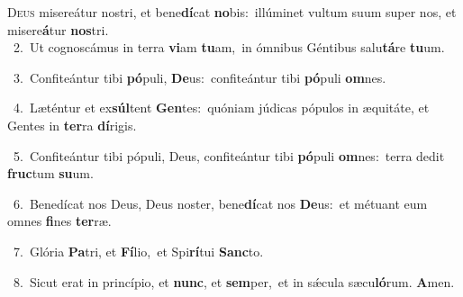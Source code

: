 \lettrine{\initial\textcolor{\initialcolor}{D}}{eus} misereátur nostri, et bene\-\textbf{dí}\-cat \textbf{no}\-bis:~\star illúminet vultum suum super nos, et misere\-\textbf{á}\-tur \textbf{nos}\-tri.\\
{\numbfont\textcolor{\numbcolor}{~2.}}~Ut cognoscámus in terra \textbf{vi}\-am \textbf{tu}\-am,~\star in ómnibus Géntibus salu\-\textbf{tá}\-re \textbf{tu}\-um.\par
{\numbfont\textcolor{\numbcolor}{~3.}}~Confiteántur tibi \textbf{pó}\-puli, \textbf{De}\-us:~\star confiteántur tibi \textbf{pó}\-puli \textbf{om}\-nes.\par
{\numbfont\textcolor{\numbcolor}{~4.}}~Læténtur et ex\-\textbf{súl}\-tent \textbf{Gen}\-tes:~\star quóniam júdicas pópulos in æquitáte, et Gentes in \textbf{ter}\-ra \textbf{dí}\-rigis.\par
{\numbfont\textcolor{\numbcolor}{~5.}}~Confiteántur tibi pópuli, Deus, confiteántur tibi \textbf{pó}\-puli \textbf{om}\-nes:~\star terra dedit \textbf{fruc}\-tum \textbf{su}\-um.\par
{\numbfont\textcolor{\numbcolor}{~6.}}~Benedícat nos Deus, Deus noster, bene\-\textbf{dí}\-cat nos \textbf{De}\-us:~\star et métuant eum omnes \textbf{fi}\-nes \textbf{ter}\-ræ.\par
{\numbfont\textcolor{\numbcolor}{~7.}}~Glória \textbf{Pa}\-tri, et \textbf{Fí}\-lio,~\star et Spi\-\textbf{rí}\-tui \textbf{Sanc}\-to.\par
{\numbfont\textcolor{\numbcolor}{~8.}}~Sicut erat in princípio, et \textbf{nunc}\-, et \textbf{sem}\-per,~\star et in sǽcula sæcu\-\textbf{ló}\-rum. \textbf{A}\-men.\par
